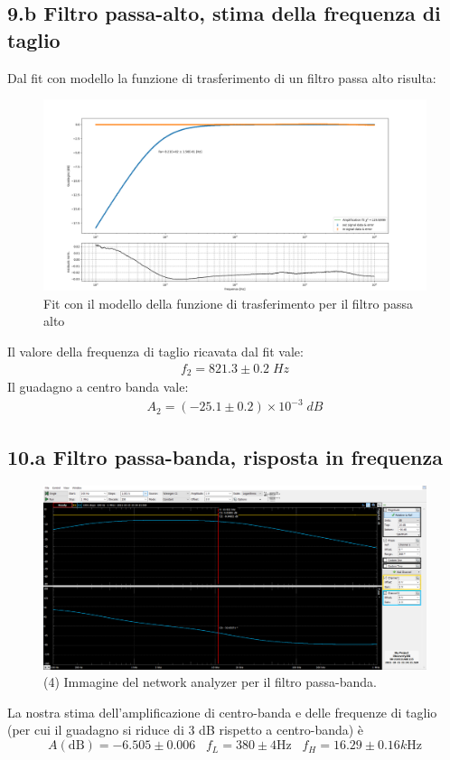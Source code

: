 \documentclass[10pt,a4paper]{article}
\begin{document}
\subsection*{9.b Filtro passa-alto, stima della frequenza di taglio}
Dal fit con modello la funzione di trasferimento di un filtro passa alto risulta:
\begin{figure}[htb]
\centering
\includegraphics[scale=0.35]{passa_alto}
\caption{Fit con il modello della funzione di trasferimento per il filtro passa alto}
\end{figure}
Il valore della frequenza di taglio ricavata dal fit vale:
\begin{align*}
f_2 = 821.3 \pm 0.2 \; \si{Hz}
\end{align*}
Il guadagno a centro banda vale:
\begin{align*}
A_2 = (-25.1 \pm 0.2) \times 10^{-3} \; \si{dB}
\end{align*}
\subsection*{10.a Filtro passa-banda, risposta in frequenza}
\begin{figure}[htb]
\centering
\includegraphics[scale=0.35]{passabanda}
\caption{(4) Immagine del network analyzer per il filtro passa-banda.}
\end{figure}
La nostra stima dell'amplificazione di centro-banda e delle frequenze di 
taglio (per cui il guadagno si riduce di 3 dB rispetto a centro-banda) \`e
\[
A(\mathrm{dB}) = -6.505 \pm 0.006 \;\;\; f_{L} = 380 \pm 4 \si{\Hz} \;\;\;
f_{H} = 16.29 \pm 0.16 \si{k\Hz}
\]
\end{document}
